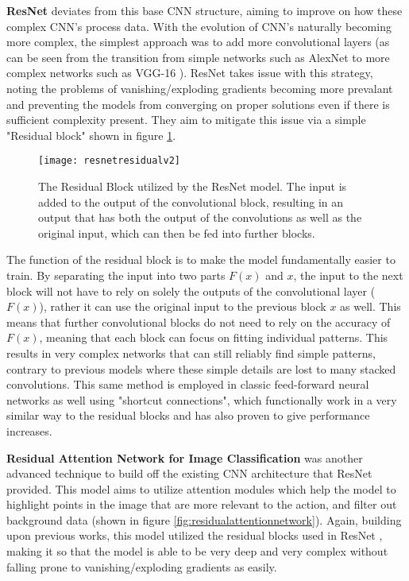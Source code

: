 \textbf{ResNet} \cite{resnet} deviates from this base CNN structure, aiming to improve on how these complex CNN's process data. With the evolution of CNN's naturally becoming more complex, the simplest approach was to add more convolutional layers (as can be seen from the transition from simple networks such as AlexNet \cite{alexnet} to more complex networks such as VGG-16 \cite{vgg16}). ResNet takes issue with this strategy, noting the problems of vanishing/exploding gradients becoming more prevalant and preventing the models from converging on proper solutions even if there is sufficient complexity present. They aim to mitigate this issue via a simple "Residual block" shown in figure \ref{fig:resnetresidual}.

\begin{figure}[ht]
	\texttt{[image: resnetresidualv2]}
	\centering
	\caption{The Residual Block utilized by the ResNet \cite{resnet} model. The input is added to the output of the convolutional block, resulting in an output that has both the output of the convolutions as well as the original input, which can then be fed into further blocks.}
	\label{fig:resnetresidual}
\end{figure}

The function of the residual block is to make the model fundamentally easier to train. By separating the input into two parts $F(x)$ and $x$, the input to the next block will not have to rely on solely the outputs of the convolutional layer ($F(x)$), rather it can use the original input to the previous block $x$ as well. This means that further convolutional blocks do not need to rely on the accuracy of $F(x)$, meaning that each block can focus on fitting individual patterns. This results in very complex networks that can still reliably find simple patterns, contrary to previous models where these simple details are lost to many stacked convolutions. This same method is employed in classic feed-forward neural networks as well using "shortcut connections", which functionally work in a very similar way to the residual blocks and has also proven to give performance increases.

\textbf{Residual Attention Network for Image Classification} \cite{residualattentionnetwork} was another advanced technique to build off the existing CNN architecture that ResNet provided. This model aims to utilize attention modules which help the model to highlight points in the image that are more relevant to the action, and filter out background data (shown in figure \ref{fig:residualattentionnetwork}). Again, building upon previous works, this model utilized the residual blocks used in ResNet \cite{resnet}, making it so that the model is able to be very deep and very complex without falling prone to vanishing/exploding gradients as easily.

